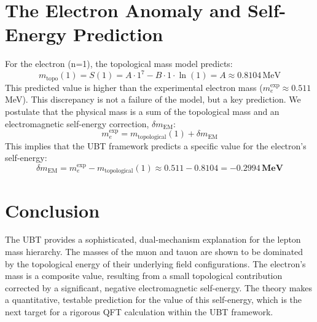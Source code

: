 \documentclass[12pt, a4paper]{article}
\begin{document}
\section{The Electron Anomaly and Self-Energy Prediction}
For the electron (n=1), the topological mass model predicts:
\begin{equation}
    m_{\text{topo}}(1) = S(1) = A \cdot 1^7 - B \cdot 1 \cdot \ln(1) = A \approx 0.8104 \, \text{MeV}
\end{equation}
This predicted value is higher than the experimental electron mass (\(m_e^{\text{exp}} \approx 0.511\) MeV). This discrepancy is not a failure of the model, but a key prediction. We postulate that the physical mass is a sum of the topological mass and an electromagnetic self-energy correction, \( \delta m_{\text{EM}} \):
\begin{equation}
    m_e^{\text{exp}} = m_{\text{topological}}(1) + \delta m_{\text{EM}}
\end{equation}
This implies that the UBT framework predicts a specific value for the electron's self-energy:
\begin{equation}
    \delta m_{\text{EM}} = m_e^{\text{exp}} - m_{\text{topological}}(1) \approx 0.511 - 0.8104 = \mathbf{-0.2994 \, \text{MeV}}
\end{equation}

\section{Conclusion}
The UBT provides a sophisticated, dual-mechanism explanation for the lepton mass hierarchy. The masses of the muon and tauon are shown to be dominated by the topological energy of their underlying field configurations. The electron's mass is a composite value, resulting from a small topological contribution corrected by a significant, negative electromagnetic self-energy. The theory makes a quantitative, testable prediction for the value of this self-energy, which is the next target for a rigorous QFT calculation within the UBT framework.
\end{document}

